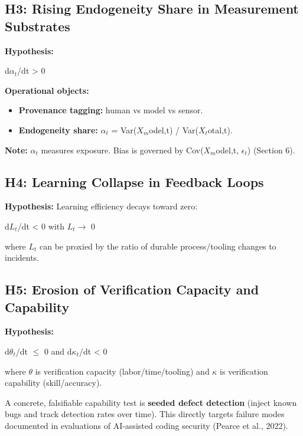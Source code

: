 \documentclass[11pt,a4paper]{article}
\providecommand{\tightlist}{\setlength{\itemsep}{0pt}\setlength{\parskip}{0pt}}
\begin{document}
\hypertarget{h3-rising-endogeneity-share-in-measurement-substrates}{%
\subsection{ H3: Rising Endogeneity Share in Measurement Substrates}\label{h3-rising-endogeneity-share-in-measurement-substrates}}

\textbf{Hypothesis:}

d$\alpha_{t}$/dt > 0

\textbf{Operational objects:}

\begin{itemize}
\tightlist
\item
  \textbf{Provenance tagging:} human vs model vs sensor.
\item
  \textbf{Endogeneity share:} $\alpha_{t}$ = Var($X_m$odel,t) / Var($X_t$otal,t).
\end{itemize}

\textbf{Note:} $\alpha_{t}$ measures exposure. Bias is governed by Cov($X_m$odel,t, $\epsilon_{t}$) (Section 6).

\hypertarget{h4-learning-collapse-in-feedback-loops}{%
\subsection{ H4: Learning Collapse in Feedback Loops}\label{h4-learning-collapse-in-feedback-loops}}

\textbf{Hypothesis:} Learning efficiency decays toward zero:

d$L_t$/dt < 0 with $L_t \to$ 0

where $L_t$ can be proxied by the ratio of durable process/tooling changes to incidents.

\hypertarget{h5-erosion-of-verification-capacity-and-capability}{%
\subsection{ H5: Erosion of Verification Capacity and Capability}\label{h5-erosion-of-verification-capacity-and-capability}}

\textbf{Hypothesis:}

d$\theta_{t}$/dt $\leq$ 0 and d$\kappa_{t}$/dt < 0

where $\theta$ is verification capacity (labor/time/tooling) and $\kappa$ is verification capability (skill/accuracy).

A concrete, falsifiable capability test is \textbf{seeded defect detection} (inject known bugs and track detection rates over time). This directly targets failure modes documented in evaluations of AI-assisted coding security (Pearce et al., 2022).
\end{document}
